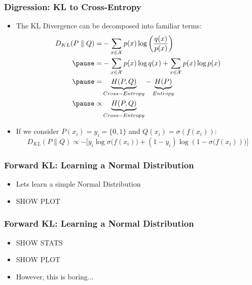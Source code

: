 \documentclass{beamer}
\begin{document}
\begin{frame}
  \frametitle{Digression: KL to Cross-Entropy}
  \begin{itemize}
    \item The KL Divergence can be decomposed into familiar terms:
    \begin{equation*}
      \begin{aligned}
        D_{KL} (P \parallel Q) =& -\sum_{x \in \mathcal {X}} p(x)\log \left({\frac {q(x)}{p(x)}}\right) \\
        \pause
        =& - \sum_{x \in \mathcal {X}} p(x)\log q(x) + \sum_{x \in \mathcal {X}} p(x)\log p(x) \\
        \pause
        =& \underbrace{H(P, Q)}_{Cross-Entropy} - \underbrace{H(P)}_{Entropy} \\
        \pause
        \propto& \underbrace{H(P, Q)}_{Cross-Entropy}
      \end{aligned}
    \end{equation*}
    \pause
    \item If we consider $P(x_i) = y_i = \{0, 1\}$ and $Q(x_i) = \sigma(f(x_i))$:
    \begin{equation*}
      D_{KL} (P \parallel Q) \propto - \Big[ y_i \log \sigma\big(f(x_i)\big) + (1 - y_i) \log (1 - \sigma \big(f(x_i))\big) \Big]
    \end{equation*}
  \end{itemize}
\end{frame}


\begin{frame}
  \frametitle{Forward KL: Learning a Normal Distribution}
  \begin{itemize}
    \item Lets learn a simple Normal Distribution
    \item SHOW PLOT
  \end{itemize}
\end{frame}

\begin{frame}
  \frametitle{Forward KL: Learning a Normal Distribution}
  \begin{itemize}
    \item SHOW STATS
    \item SHOW PLOT
    \item However, this is boring...
  \end{itemize}
\end{frame}
\end{document}
